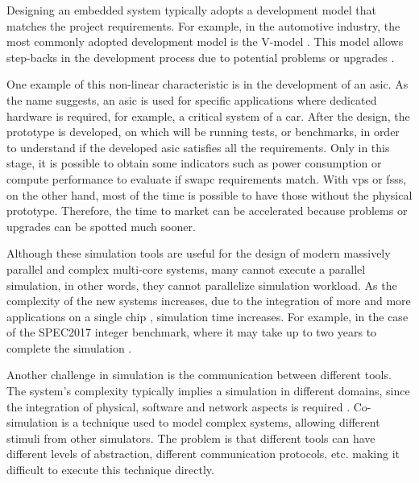 


Designing an embedded system typically adopts a development model that matches the project requirements. 
For example, in the automotive industry, the most commonly adopted development model is the V-model \cite{liu2016incremental}. This model 
allows step-backs in the development process due to potential problems or upgrades \cite{ProductDesignSteps}. 

One example of this non-linear characteristic is in the development of an \gls{asic}. As the name suggests, an \gls{asic} is used for specific 
applications where dedicated hardware is required, for example, a critical system of a car. After the design, the prototype is developed, on 
which will be running tests, or benchmarks, in order to understand if the developed \gls{asic} satisfies all the requirements. Only in this stage, 
it is possible to obtain some indicators such as power consumption or compute performance to evaluate if \gls{swapc} requirements match. 
With \glspl{vp} or \glspl{fss}, on the other hand, most of the time is possible to have those without the physical prototype. 
Therefore, the time to market can be accelerated because problems or upgrades can be spotted much sooner.

Although these simulation tools are useful for the design of modern massively parallel and complex multi-core systems, 
many cannot execute a parallel simulation, in other words, they cannot parallelize simulation workload. 
As the complexity of the new systems increases, due to the integration of more and more applications on a single chip 
\cite{terascaleComputing}, simulation time increases.
For example, in the case of the SPEC2017 integer benchmark, where it may 
take up to two years to complete the simulation \cite{pargem5}. 

Another challenge in simulation is the communication between different tools. The system's complexity typically implies a simulation in 
different domains, since the integration of physical, software and network aspects is required \cite{gomes2017co}. Co-simulation is a technique 
used to model complex systems, allowing different stimuli from other simulators. The problem is that different tools can have different levels 
of abstraction, different communication protocols, etc. making it difficult to execute this technique directly. 

